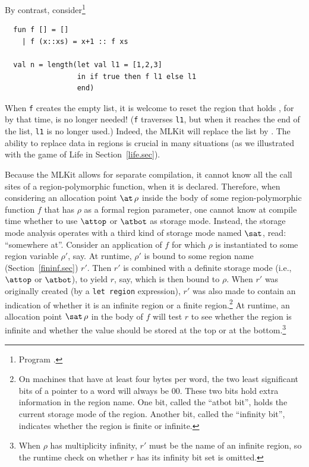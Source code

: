 \documentclass[12pt]{book}
\begin{document}
By contrast, consider\footnote{Program .}
\begin{verbatim}
  fun f [] = []
    | f (x::xs) = x+1 :: f xs

  val n = length(let val l1 = [1,2,3]
                 in if true then f l1 else l1
                 end)
\end{verbatim}
When {\tt f} creates the empty list, it is welcome to reset the region
that holds , for by that time,  is no longer
needed! ({\tt f} traverses {\tt l1}, but when it reaches the end of
the list, {\tt l1} is no longer used.)  Indeed, the MLKit will replace
the list \boxml{[1,2,3]} by \boxml{[2,3,4]}. The ability to replace
data in regions is crucial in many situations (as we illustrated with
the game of Life in Section~\ref{life.sec}).

Because the MLKit allows for separate compilation, it cannot know all
the call sites of a region-polymorphic function, when it is declared.
Therefore, when considering an allocation point $\at\,\rho$ inside the
body of some region-polymorphic function $f$ that has $\rho$ as a
formal region parameter, one cannot know at compile time whether to
use $\attop$ or $\atbot$ as storage mode.  Instead, the storage mode
analysis operates with a third kind of storage mode named $\sat$,
read: ``somewhere at''. Consider an application of $f$ for which
$\rho$ is instantiated to some region variable $\rho'$, say. At
runtime, $\rho'$ is bound to some region name
(Section~\ref{fininf.sec}) $r'$.  Then $r'$ is combined with a
definite storage mode (i.e., $\attop$ or $\atbot$), to yield $r$, say,
which is then bound to $\rho$.  When $r'$ was originally created (by a
{\tt let region} expression), $r'$ was also made to contain an
indication of whether it is an infinite region or a finite
region.\footnote{On machines\label{atbit.lab} that have at least four
  bytes per word, the two least significant bits of a pointer to a
  word will always be 00. These two bits hold extra information in the
  region name.  One bit, called the ``atbot bit'', holds the current
  storage mode of the region. Another bit, called the ``infinity
  bit'', indicates whether the region is finite or infinite.}  At
runtime, an allocation point $\sat\,\rho$ in the body of $f$ will test
$r$ to see whether the region is infinite and whether the value should
be stored at the top or at the bottom.\footnote{When $\rho$ has
  multiplicity infinity, $r'$ must be the name of an infinite region,
  so the runtime check on whether $r$ has its infinity bit set is
  omitted.}
\end{document}
